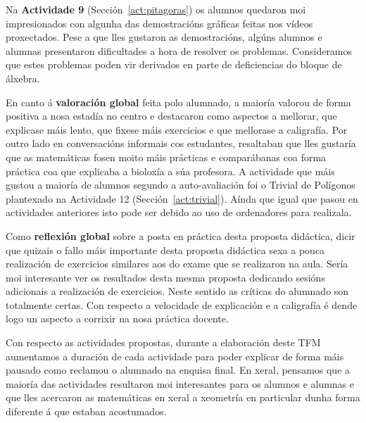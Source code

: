 Na \textbf{Actividade 9} (Sección~\ref{act:pitagoras}) os alumnos quedaron moi impresionados con algunha das demostracións gráficas feitas nos vídeos proxectados. Pese a que lles gustaron as demostracións, algúns alumnos e alumnas presentaron dificultades a hora de resolver os problemas. Consideramos que estes problemas poden vir derivados en parte de deficiencias do bloque de álxebra.

En canto á \textbf{valoración global} feita polo alumnado, a maioría valorou de forma positiva a nosa estadía no centro e destacaron como aspectos a mellorar, que explicase máis lento, que fixese máis exercicios e que mellorase a caligrafía. Por outro lado en conversacións informais cos estudantes, resaltaban que lles gustaría que as matemáticas fosen moito máis prácticas e comparábanas coa forma práctica coa que explicaba a bioloxía a súa profesora. A actividade que máis gustou a maioría de alumnos segundo a auto-avaliación foi o Trivial de Polígonos plantexado na Actividade 12 (Sección~\ref{act:trivial}). Aínda que igual que pasou en actividades anteriores isto pode ser debido ao uso de ordenadores para realizala.

Como \textbf{reflexión global} sobre a posta en práctica desta proposta didáctica, dicir que quizais o fallo máis importante desta proposta didáctica sexa a pouca realización de exercicios similares aos do exame que se realizaron na aula. Sería moi interesante ver os resultados desta mesma proposta dedicando sesións adicionais a realización de exercicios. Neste sentido as críticas do alumnado son totalmente certas. Con respecto a velocidade de explicación e a caligrafía é dende logo un aspecto a corrixir na nosa práctica docente.

Con respecto as actividades propostas, durante a elaboración deste TFM aumentamos a duración de cada actividade para poder explicar de forma máis pausado como reclamou o alumnado na enquisa final. En xeral, pensamos que a maioría das actividades resultaron moi interesantes para os alumnos e alumnas e que lles acercaron as matemáticas en xeral a xeometría en particular dunha forma diferente á que estaban acostumados.
